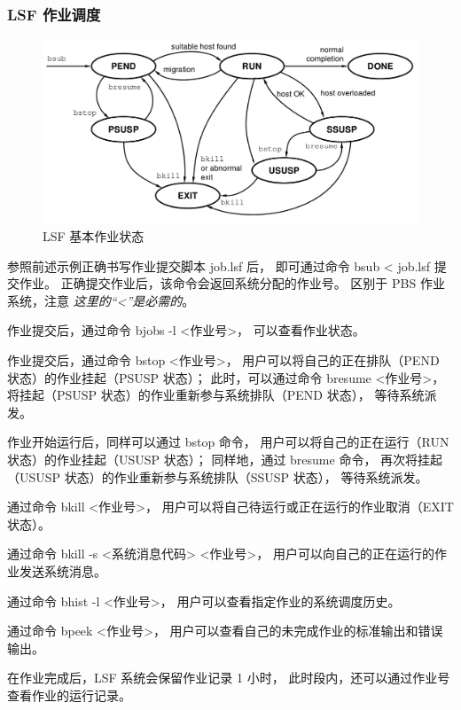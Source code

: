 \documentclass[UTF8]{ctexart}
\newcommand{\myem}[1]{{\color{red}\em #1}}
\newcommand{\mynnote}[1]{\colorbox{gray!15}{\color{blue!65}#1}}
\begin{document}
\subsubsection{LSF 作业调度}
\begin{figure}[h]
  \centering
  \includegraphics[width=140mm]{material/bjobstate.png}
  \caption{LSF 基本作业状态}
\end{figure}

参照前述示例正确书写作业提交脚本 job.lsf 后，
即可通过命令 \mynnote{bsub < job.lsf} 提交作业。
正确提交作业后，该命令会返回系统分配的作业号。
区别于 PBS 作业系统，注意 \myem{这里的“<”是必需的}。

作业提交后，通过命令 \mynnote{bjobs -l <作业号>}，
可以查看作业状态。

作业提交后，通过命令 \mynnote{bstop <作业号>}，
用户可以将自己的正在排队（PEND 状态）的作业挂起（PSUSP 状态）；
此时，可以通过命令 \mynnote{bresume <作业号>}，
将挂起（PSUSP 状态）的作业重新参与系统排队（PEND 状态），
等待系统派发。

作业开始运行后，同样可以通过 bstop 命令，
用户可以将自己的正在运行（RUN 状态）的作业挂起（USUSP 状态）；
同样地，通过 bresume 命令，
再次将挂起（USUSP 状态）的作业重新参与系统排队（SSUSP 状态），
等待系统派发。

通过命令 \mynnote{bkill <作业号>}，
用户可以将自己待运行或正在运行的作业取消（EXIT 状态）。

通过命令 \mynnote{bkill -s <系统消息代码> <作业号>}，
用户可以向自己的正在运行的作业发送系统消息。

通过命令 \mynnote{bhist -l <作业号>}，
用户可以查看指定作业的系统调度历史。

通过命令 \mynnote{bpeek <作业号>}，
用户可以查看自己的未完成作业的标准输出和错误输出。

在作业完成后，LSF 系统会保留作业记录 1 小时，
此时段内，还可以通过作业号查看作业的运行记录。
\end{document}
